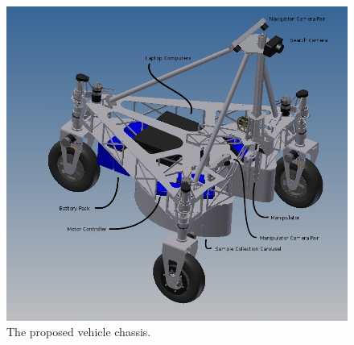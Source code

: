 \documentclass[12pt]{article}
\begin{document}


\begin{figure}[htbp]
\centering
\includegraphics[width=4.5in]{../assets/overalliso.jpg}
\caption{The proposed vehicle chassis.}
\label{fig_bot_chassis}
\end{figure}
\end{document}
